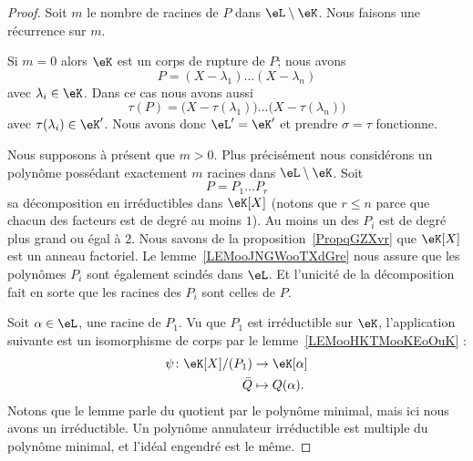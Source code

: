\begin{proof}
    Soit \( m\) le nombre de racines de \( P\) dans \( \eL\setminus \eK\). Nous faisons une récurrence sur \( m\).

    Si \( m=0\) alors \( \eK\) est un corps de rupture de \( P\); nous avons
    \begin{equation}
        P=(X-\lambda_1)\ldots (X-\lambda_n)
    \end{equation}
    avec \( \lambda_i\in \eK\). Dans ce cas nous avons aussi
    \begin{equation}
        \tau(P)=\big( X-\tau(\lambda_1) \big)\ldots \big( X-\tau(\lambda_n) \big)
    \end{equation}
    avec \( \tau(\lambda_i)\in \eK'\). Nous avons donc \( \eL'=\eK'\) et prendre \( \sigma=\tau\) fonctionne.

    Nous supposons à présent que \( m>0\). Plus précisément nous considérons un polynôme possédant exactement \( m\) racines dans \( \eL\setminus \eK\). Soit
    \begin{equation}
        P=P_1\ldots P_r
    \end{equation}
    sa décomposition en irréductibles dans \( \eK[X]\) (notons que \( r\leq n\) parce que chacun des facteurs est de degré au moins \( 1\)). Au moins un des \( P_i\) est de degré plus grand ou égal à \( 2\). Nous savons de la proposition~\ref{PropqGZXvr} que \( \eK[X]\) est un anneau factoriel. Le lemme~\ref{LEMooJNGWooTXdGre} nous assure que les polynômes \( P_i\) sont également scindés dans \( \eL\). Et l'unicité de la décomposition fait en sorte que les racines des \( P_i\) sont celles de \( P\).

    Soit \( \alpha\in \eL\), une racine de \( P_1\). Vu que \( P_1\) est irréductible sur \( \eK\), l'application suivante est un isomorphisme de corps par le lemme~\ref{LEMooHKTMooKEoOuK} :
    \begin{equation}
        \begin{aligned}
            \psi\colon \eK[X]/(P_1)&\to \eK[\alpha] \\
            \bar Q&\mapsto Q(\alpha).
        \end{aligned}
    \end{equation}
    Notons que le lemme parle du quotient par le polynôme minimal, mais ici nous avons un irréductible. Un polynôme annulateur irréductible est multiple du polynôme minimal, et l'idéal engendré est le même.


\end{proof}
